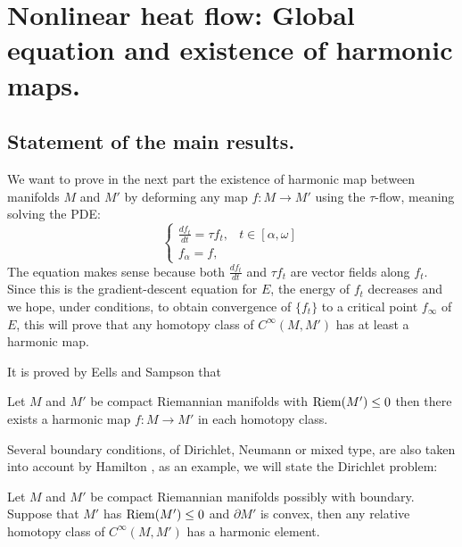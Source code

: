 \section{Nonlinear heat flow: Global equation and existence of harmonic maps.}
\label{sec:orgb2eb562}
\subsection{Statement of the main results.}
\label{sec:org1eb8119}

We want to prove in the next part the existence of harmonic map between manifolds \(M\)
and \(M'\) by deforming any map \(f: M
\longrightarrow M'\) using the \(\tau\)-flow, meaning solving the PDE:
\begin{equation}
\label{eq:loc-heat-flow}
\begin{cases}
\frac{d f_t}{d t} = \tau f_t,  & t\in [\alpha,\omega] \\
f_\alpha = f, & 
\end{cases}
\end{equation}
The equation makes sense because both \(\frac{d f_t}{d t}\) and \(\tau f_t\) are
vector fields along \(f_t\). Since this is the gradient-descent equation for \(E\),
the energy of \(f_t\) decreases and we hope, under conditions, to obtain
convergence of \(\{f_t\}\) to a critical point \(f_\infty\) of \(E\), this will prove
that any homotopy class of \(C^\infty(M,M')\) has at least a harmonic map.

It is proved by Eells and Sampson \cite{eells_harmonic_1964} that
\begin{theorem}
\label{thm:eells-sampson}
Let \(M\) and \(M'\) be compact Riemannian manifolds with \({\rm Riem } (M') \leq 0\) then there exists a harmonic map \(f: M \longrightarrow M'\) in each homotopy class.
\end{theorem}

Several boundary conditions, of Dirichlet, Neumann or mixed type, are also taken into account by Hamilton
\cite{hamilton_harmonic_1975}, as an example, we will state the Dirichlet problem:

\begin{theorem}[Hamilton]
\label{thm:hamilton-bndry-Dirichlet}
Let \(M\) and \(M'\) be compact Riemannian manifolds possibly with boundary. Suppose
that \(M'\) has \({\rm Riem } (M')\leq 0\) and \(\partial M'\) is convex, then any
relative homotopy class of \(C^\infty(M,M')\) has a harmonic element. 
\end{theorem}

